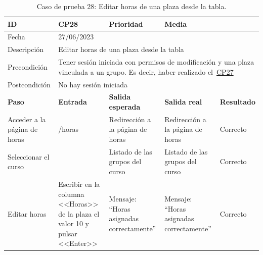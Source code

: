 \begin{table}[H]
\begin{tabular}{p{} p{} p{} p{} p{}}
\cellcolor{gray!25}
ID   & CP28 & \cellcolor{gray!25} Prioridad   & Media \\ \hline
\cellcolor{gray!25} Fecha	&	\multicolumn{4}{l}{27/06/2023} \\ \hline
\cellcolor{gray!25} Descripción		&	\multicolumn{4}{l}{Editar horas de una plaza desde la tabla} \\ \hline                                            
\cellcolor{gray!25}
Precondición  & \multicolumn{4}{p{.66\textwidth}}{Tener sesión iniciada con permisos de modificación y una plaza vinculada a un grupo. Es decir, haber realizado el~\hyperref[CP-27]{CP27}} \\ \hline
\cellcolor{gray!25} Postcondición & \multicolumn{4}{l}{No hay sesión iniciada}                                                    \\ \hline
\rowcolor{gray!25}
\textbf{Paso}   & \textbf{Entrada} & \textbf{Salida esperada} & \textbf{Salida real} & \textbf{Resultado} \\ \hline
Acceder a la página de horas
& /horas                                                                          
& Redirección a la página de horas                                
& Redirección a la página de horas                                
& Correcto                            
\\ \hline
Seleccionar el curso
& 
& Listado de las grupos del curso
& Listado de las grupos del curso
& Correcto
\\ \hline
Editar horas
& Escribir en la columna <<Horas>> de la plaza el valor 10 y pulsar <<Enter>>
& Mensaje: ``Horas asignadas correctamente''
& Mensaje: ``Horas asignadas correctamente''
& Correcto
\\ \hline    
\end{tabular}
\caption{Caso de prueba 28: Editar horas de una plaza desde la tabla.}
\end{table}

